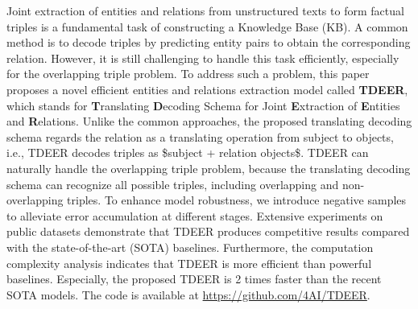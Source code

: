 Joint extraction of entities and relations from unstructured texts to form factual triples is a fundamental task of constructing a Knowledge Base (KB). A common method is to decode triples by predicting entity pairs to obtain the corresponding relation. However, it is still challenging to handle this task efficiently, especially for the overlapping triple problem. To address such a problem, this paper proposes a novel efficient entities and relations extraction model called \textbf{TDEER}, which stands for \textbf{T}ranslating \textbf{D}ecoding Schema for Joint \textbf{E}xtraction of \textbf{E}ntities and \textbf{R}elations. Unlike the common approaches, the proposed translating decoding schema regards the relation as a translating operation from subject to objects, i.e., TDEER decodes triples as \$subject + relation \rightarrow objects\$. TDEER can naturally handle the overlapping triple problem,  because the translating decoding schema can recognize all possible triples, including overlapping and non-overlapping triples. To enhance model robustness, we introduce negative samples to alleviate error accumulation at different stages. Extensive experiments on public datasets demonstrate that TDEER produces competitive results compared with the state-of-the-art (SOTA) baselines. Furthermore, the computation complexity analysis indicates that TDEER is more efficient than powerful baselines. Especially, the proposed TDEER is 2 times faster than the recent SOTA models. The code is available at \url{https://github.com/4AI/TDEER}.
